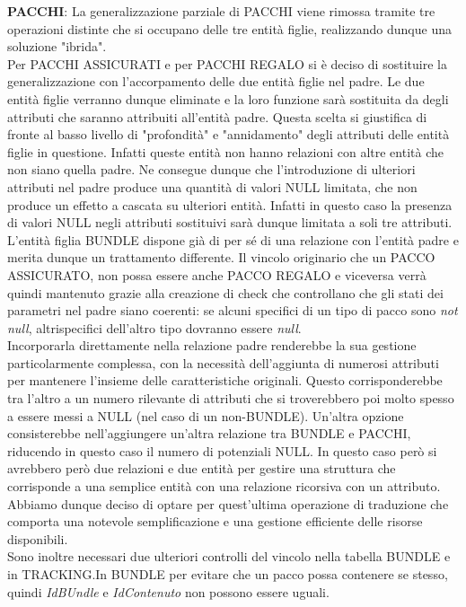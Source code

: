 \textbf{PACCHI}: La generalizzazione parziale di PACCHI viene rimossa tramite tre operazioni distinte che si occupano delle tre entità figlie, realizzando dunque una soluzione "ibrida".\\
Per PACCHI ASSICURATI e per PACCHI REGALO si è deciso di sostituire la generalizzazione con l'accorpamento delle due entità figlie nel padre. Le due entità figlie verranno dunque eliminate e 
la loro funzione sarà sostituita da degli attributi che saranno attribuiti all'entità padre. 
Questa scelta si giustifica di fronte al basso livello di "profondità" e "annidamento" degli attributi delle entità figlie in questione. Infatti queste entità non hanno relazioni con altre entità che non siano quella padre. 
Ne consegue dunque che l'introduzione di ulteriori attributi nel padre produce una quantità di valori NULL limitata, che non produce un effetto a cascata su ulteriori entità. Infatti in questo caso la presenza di valori NULL negli attributi sostituivi sarà dunque limitata a soli tre attributi.\\
L'entità figlia BUNDLE dispone già di per sé di una relazione con l'entità padre e merita dunque un trattamento differente. Il vincolo originario che un PACCO ASSICURATO, non possa essere anche PACCO REGALO e viceversa verrà quindi mantenuto grazie alla creazione di check che controllano che gli stati dei parametri nel padre siano coerenti: se alcuni specifici di un tipo di pacco sono \textit{not null}, altrispecifici dell'altro tipo dovranno essere \textit{null}.\\
Incorporarla direttamente nella relazione padre renderebbe la sua gestione particolarmente complessa, con la necessità dell'aggiunta di numerosi attributi per mantenere l'insieme delle caratteristiche originali. Questo corrisponderebbe tra l'altro a un numero rilevante di attributi che si troverebbero poi molto spesso a essere messi a NULL (nel caso di un non-BUNDLE). 
Un'altra opzione consisterebbe  nell'aggiungere un'altra relazione tra BUNDLE e PACCHI, riducendo in questo caso il numero di potenziali NULL. In questo caso però si avrebbero però due relazioni e due entità per gestire una struttura che corrisponde a una semplice entità con una relazione ricorsiva con un attributo. Abbiamo dunque deciso di optare per quest'ultima operazione di traduzione che comporta una notevole semplificazione e una gestione efficiente delle risorse disponibili.\\
Sono inoltre necessari due ulteriori controlli del vincolo nella tabella BUNDLE e in TRACKING.In BUNDLE per evitare che un pacco possa contenere se stesso, quindi \textit{IdBUndle} e \textit{IdContenuto} non possono essere uguali.\\
